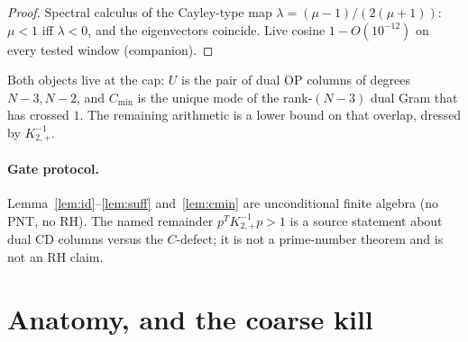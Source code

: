 \documentclass[11pt]{article}
\theoremstyle{remark}
\newcommand{\Kp}{K_{2,+}}
\begin{document}
\begin{proof}
Spectral calculus of the Cayley-type map
$\lambda=(\mu-1)/(2(\mu+1))$: $\mu<1$ iff $\lambda<0$, and the
eigenvectors coincide.  Live cosine $1-O(10^{-12})$ on every
tested window (companion).
\end{proof}

Both objects live at the cap: $U$ is the pair of dual OP columns
of degrees $N-3,N-2$, and $C_{\min}$ is the unique mode of the
rank-$(N-3)$ dual Gram that has crossed $1$.  The remaining
arithmetic is a lower bound on that overlap, dressed by $\Kp^{-1}$.

\paragraph{Gate protocol.}
Lemma~\ref{lem:id}--\ref{lem:suff} and~\ref{lem:cmin} are
unconditional finite algebra (no PNT, no RH).
The named remainder $p^{T}\Kp^{-1}p>1$ is a source statement
about dual CD columns versus the $C$-defect; it is not a
prime-number theorem and is not an RH claim.

\section{Anatomy, and the coarse kill}\label{sec:anatomy}
\end{document}

